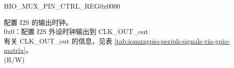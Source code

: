 \begin{register}{H}{IO\_MUX\_PIN\_CTRL\_REG}{0x0000}\label{regdesc:IOMUXPINCTRLREG}
%
%
%
%
\regnewline%
\begin{regdesc}\begin{reglist}
\label{fielddesc:IOMUXCLKOUT1}\item [IO\_MUX\_CLK\_OUT\regindex{x} (\regindex{x}: 1 - 3)] 配置 I2S 的输出时钟。\\
0x0：配置 I2S 外设时钟输出到 CLK\_OUT\_out\\
有关 CLK\_OUT\_out 的信息，见表 \ref{tab:iomuxgpio-periph-signals-via-gpio-matrix}。 \\(R/W)
\end{reglist}\end{regdesc}
\end{register}


